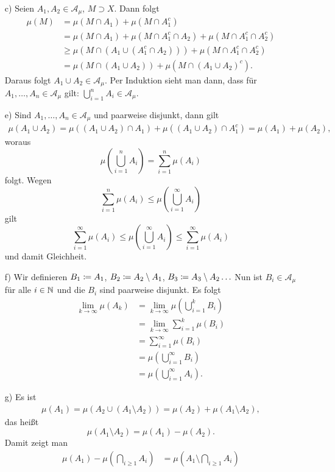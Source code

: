 \documentclass[a4paper,twoside,DIV15,BCOR12mm]{scrbook}
\newcommand{\A}{\mathcal A}
\begin{document}
\begin{beweis}
\begin{enumerate}
\item[c)] Seien $A_1,A_2\in \A_\mu$, $M\supset X$. Dann folgt
\begin{align*}
\mu(M) &= \mu(M\cap A_1) + \mu(M\cap A_1^c) \\
&= \mu(M\cap A_1) + \mu(M\cap A_1^c\cap A_2) + \mu(M\cap A_1^c \cap A_2^c) \\
&\ge \mu(M \cap (A_1 \cup (A_1^c \cap A_2))) + \mu(M \cap A_1^c \cap A_2^c) \\
&= \mu(M\cap (A_1 \cup A_2)) + \mu(M\cap (A_1\cup A_2)^c).
\end{align*}
Daraus folgt $A_1\cup A_2 \in \A_\mu$. Per Induktion sieht man dann, dass für $A_1,\ldots,A_n\in\A_\mu$ gilt: $\bigcup_{i=1}^n A_i \in \A_\mu$.
\item[e)] Sind $A_1,\ldots,A_n\in\A_\mu$ und paarweise disjunkt, dann gilt
\begin{align*}
\mu(A_1\cup A_2) = \mu( (A_1\cup A_2)\cap A_1) + \mu( (A_1\cup A_2)\cap A_1^c) 
= \mu(A_1) + \mu(A_2),
\end{align*}
woraus
\[
\mu(\bigcup_{i=1}^n A_i) = \sum_{i=1}^n \mu(A_i)
\]
folgt. Wegen
\[
\sum_{i=1}^n \mu(A_i) \le \mu(\bigcup_{i=1}^\infty A_i)
\]
gilt
\[
\sum_{i=1}^\infty \mu(A_i) \le \mu(\bigcup_{i=1}^\infty A_i) \le \sum_{i=1}^\infty \mu(A_i)
\]
und damit Gleichheit.
\item[f)] Wir definieren $B_1 \da A_1$, $B_2 \da A_2\setminus A_1$, $B_3 \da A_3\setminus A_2\ldots$ Nun ist $B_i\in \A_\mu$ für alle $i\in\mathbb{N}$ und die $B_i$ sind paarweise disjunkt. Es folgt
\begin{align*}
\lim_{k\to\infty} \mu(A_k) 
&= \lim_{k\to\infty} \mu(\bigcup_{i=1}^k B_i) \\
&= \lim_{k\to\infty} \sum_{i=1}^k \mu(B_i)\\
&= \sum_{i=1}^\infty \mu(B_i) \tag{nach e)}\\
&= \mu(\bigcup_{i=1}^\infty B_i) \\
&= \mu(\bigcup_{i=1}^\infty A_i).
\end{align*}
\item[g)] Es ist
\begin{align*}
\mu(A_1) = \mu(A_2\cup (A_1\setminus A_2)) = \mu(A_2) + \mu(A_1\setminus A_2),
\end{align*}
das heißt
\[
\mu(A_1\setminus A_2) = \mu(A_1) - \mu(A_2).
\]
Damit zeigt man
\begin{align*}
\mu(A_1) -  \mu(\bigcap_{i\ge 1} A_i) 
&= \mu(A_1\setminus \bigcap_{i\ge1}A_i)  \\

\end{align*}
\end{enumerate}
\end{beweis}
\end{document}
